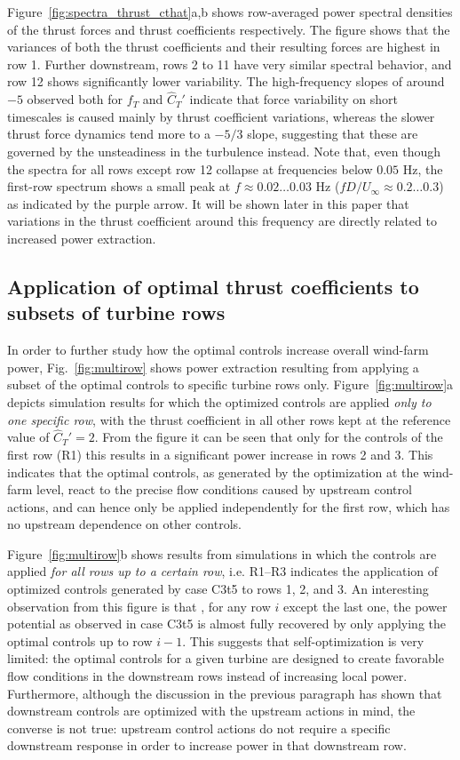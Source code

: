 \documentclass[wes, manuscript]{copernicus}
\newcommand{\cthat}{\widehat{C}_T'}
\begin{document}
Figure~\ref{fig:spectra_thrust_cthat}a,b shows row-averaged power spectral densities of the thrust forces and thrust coefficients respectively. The figure shows that the variances of both the thrust coefficients and their resulting forces are highest in row 1. Further downstream, rows 2 to 11 have very similar spectral behavior, and row 12 shows significantly lower variability. The high-frequency slopes of around $-5$ observed both for $f_T$ and $\cthat$ indicate that force variability on short timescales is caused mainly by thrust coefficient variations, whereas the slower thrust force dynamics tend more to a $-5/3$ slope, suggesting that these are governed by the unsteadiness in the turbulence instead. Note that, even though the spectra for all rows except row 12 collapse at frequencies below $0.05$ Hz, the first-row spectrum shows a small peak at $f \approx 0.02 \dots 0.03$ Hz ($f D / U_\infty \approx 0.2 \dots 0.3$) as indicated by the purple arrow. It will be shown later in this paper that variations in the thrust coefficient around this frequency are directly related to increased power extraction. 

\subsection{Application of optimal thrust coefficients to subsets of turbine rows}\label{sec:application_subset}

In order to further study how the optimal controls increase overall wind-farm power, Fig.~\ref{fig:multirow} shows power extraction resulting from applying a subset of the optimal controls to specific turbine rows only. Figure~\ref{fig:multirow}a depicts simulation results for which the  optimized controls are applied \emph{only to one specific row}, with the thrust coefficient in all other rows kept at the reference value of $\cthat = 2$. From the figure it can be seen that only for the controls of the first row (R1) this results in a significant power increase in rows 2 and 3. This indicates that the optimal controls, as generated by the optimization at the wind-farm level, react to the precise flow conditions caused by upstream control actions, and can hence only be applied independently for the first row, which has no upstream dependence on other controls. 

Figure~\ref{fig:multirow}b shows results from simulations in which the controls are applied \emph{for all rows up to a certain row}, i.e. R1--R3 indicates the application of optimized controls generated by case C3t5 to rows 1, 2, and 3. An interesting observation from this figure is that , for any row $i$ except the last one, the power potential as observed in case C3t5 is almost fully recovered by only applying the optimal controls up to row $i-1$. This suggests that self-optimization is very limited: the optimal controls for a given turbine are designed to create favorable flow conditions in the downstream rows instead of increasing local power. Furthermore, although the discussion in the previous paragraph has shown that downstream controls are optimized with the upstream actions in mind, the converse is not true: upstream control actions do not require a specific downstream response in order to increase power in that downstream row. 
\end{document}
